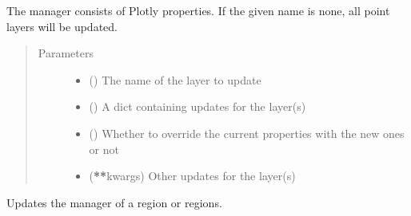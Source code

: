 \documentclass[letterpaper,10pt,english]{sphinxmanual}
\begin{document}
\begin{fulllineitems}
\begin{fulllineitems}
\sphinxAtStartPar
The manager consists of Plotly properties.
If the given name is none, all point layers will be updated.
\begin{quote}\begin{description}
\item[{Parameters}] \leavevmode\begin{itemize}
\item {} 
\sphinxAtStartPar
{} () \textendash{} The name of the layer to update

\item {} 
\sphinxAtStartPar
{} () \textendash{} A dict containing updates for the layer(s)

\item {} 
\sphinxAtStartPar
{} () \textendash{} Whether to override the current properties with the new ones or not

\item {} 
\sphinxAtStartPar
{} ({\color{red}\bfseries{}**}kwargs) \textendash{} Other updates for the layer(s)

\end{itemize}

\end{description}\end{quote}

\end{fulllineitems}


\begin{fulllineitems}
\label{\detokenize{builder:geohexviz.builder.PlotBuilder.update_region_manager}}
\sphinxAtStartPar
Updates the manager of a region or regions.


\end{fulllineitems}
\end{fulllineitems}
\end{document}
